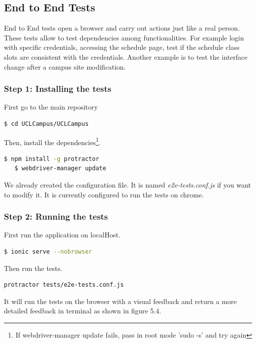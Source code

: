 \documentclass{eplmastersthesis}
\begin{document}
\subsection{End to End Tests}

End to End tests open a browser and carry out actions just like a real person. These tests allow to test dependencies among functionalities. For example login with specific credentials, accessing the schedule page, test if the schedule class slots are consistent with the credentials. Another example is to test the interface change after a campus site modification.

\subsubsection{Step 1: Installing the tests}

First go to the main repository
\begin{lstlisting}[language=bash]
   $ cd UCLCampus/UCLCampus
\end{lstlisting}

Then, install the dependencies\footnote{If webdriver-manager update fails, pass in root mode 'sudo -s' and try again}.
\begin{lstlisting}[language=bash]
   $ npm install -g protractor
   $ webdriver-manager update
\end{lstlisting}

We already created the configuration file. It is named\textit{ e2e-tests.conf.js} if you want to modify it. It is currently configured to run the tests on chrome.

\subsubsection{Step 2: Running the tests}

First run the application on localHost.

\begin{lstlisting}[language=bash]
   $ ionic serve --nobrowser
\end{lstlisting}

Then run the tests.

\begin{lstlisting}[language=bash]
   protractor tests/e2e-tests.conf.js
\end{lstlisting}

It will run the tests on the browser with a visual feedback and return a more detailed feedback in terminal as shown in figure 5.4.
\end{document}
